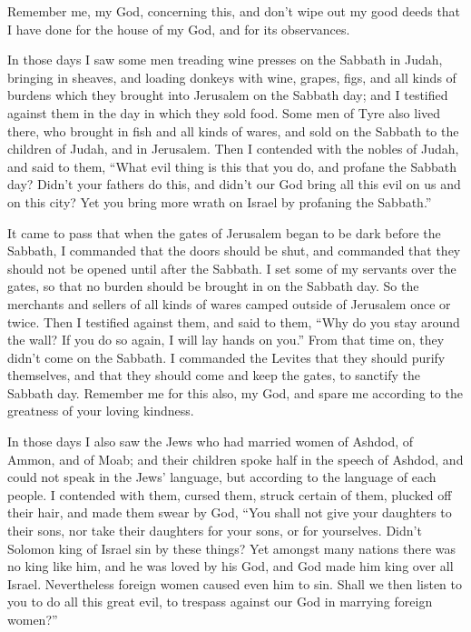  Remember me, my God, concerning this, and don't wipe out
my good deeds that I have done for the house of my God, and for its
observances.

 In those days I saw some men treading wine presses on
the Sabbath in Judah, bringing in sheaves, and loading donkeys with
wine, grapes, figs, and all kinds of burdens which they brought into
Jerusalem on the Sabbath day; and I testified against them in the day in
which they sold food.  Some men of Tyre also lived there,
who brought in fish and all kinds of wares, and sold on the Sabbath to
the children of Judah, and in Jerusalem.  Then I
contended with the nobles of Judah, and said to them, ``What evil thing
is this that you do, and profane the Sabbath day?  Didn't
your fathers do this, and didn't our God bring all this evil on us and
on this city? Yet you bring more wrath on Israel by profaning the
Sabbath.''

 It came to pass that when the gates of Jerusalem began
to be dark before the Sabbath, I commanded that the doors should be
shut, and commanded that they should not be opened until after the
Sabbath. I set some of my servants over the gates, so that no burden
should be brought in on the Sabbath day.  So the
merchants and sellers of all kinds of wares camped outside of Jerusalem
once or twice.  Then I testified against them, and said
to them, ``Why do you stay around the wall? If you do so again, I will
lay hands on you.'' From that time on, they didn't come on the Sabbath.
 I commanded the Levites that they should purify
themselves, and that they should come and keep the gates, to sanctify
the Sabbath day. Remember me for this also, my God, and spare me
according to the greatness of your loving kindness.

 In those days I also saw the Jews who had married women
of Ashdod, of Ammon, and of Moab;  and their children
spoke half in the speech of Ashdod, and could not speak in the Jews'
language, but according to the language of each people. 
I contended with them, cursed them, struck certain of them, plucked off
their hair, and made them swear by God, ``You shall not give your
daughters to their sons, nor take their daughters for your sons, or for
yourselves.  Didn't Solomon king of Israel sin by these
things? Yet amongst many nations there was no king like him, and he was
loved by his God, and God made him king over all Israel. Nevertheless
foreign women caused even him to sin.  Shall we then
listen to you to do all this great evil, to trespass against our God in
marrying foreign women?''

